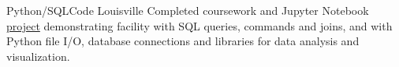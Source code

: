 {Python/SQL}{}{}{Code Louisville}
{Completed coursework and Jupyter Notebook \href{https://github.com/jacobarchambault/cpi-python}{project} demonstrating facility with SQL queries, commands and joins, 
	and with Python file I/O, database connections and libraries for data analysis and visualization.}
